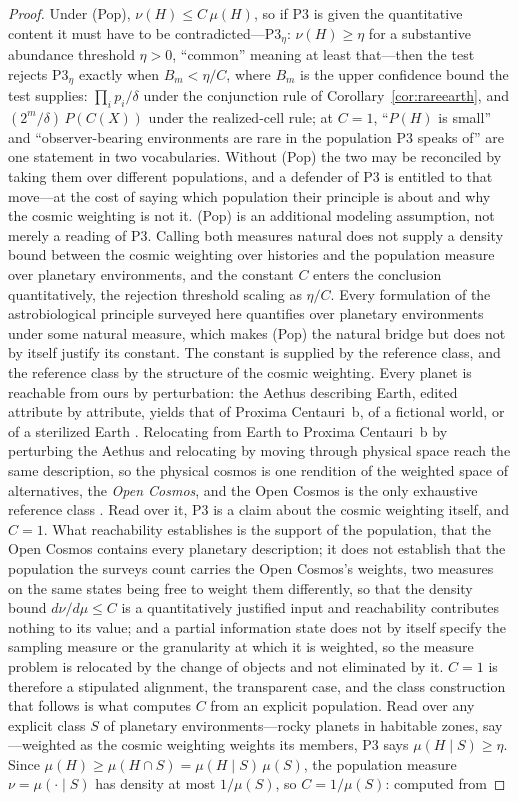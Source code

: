 \begin{proof}
Under (Pop), $\nu(H) \le C\,\mu(H)$, so if P3 is given the quantitative content it must have to be contradicted---$\mathrm{P3}_\eta$: $\nu(H) \ge \eta$ for a substantive abundance threshold $\eta > 0$, ``common'' meaning at least that---then the test rejects $\mathrm{P3}_\eta$ exactly when $B_m < \eta/C$, where $B_m$ is the upper confidence bound the test supplies: $\prod_i p_i/\delta$ under the conjunction rule of Corollary~\ref{cor:rareearth}, and $(2^m/\delta)\,P(C(X))$ under the realized-cell rule; at $C = 1$, ``$P(H)$ is small'' and ``observer-bearing environments are rare in the population P3 speaks of'' are one statement in two vocabularies. Without (Pop) the two may be reconciled by taking them over different populations, and a defender of P3 is entitled to that move---at the cost of saying which population their principle is about and why the cosmic weighting is not it. (Pop) is an additional modeling assumption, not merely a reading of P3. Calling both measures natural does not supply a density bound between the cosmic weighting over histories and the population measure over planetary environments, and the constant $C$ enters the conclusion quantitatively, the rejection threshold scaling as $\eta/C$. Every formulation of the astrobiological principle surveyed here quantifies over planetary environments under some natural measure, which makes (Pop) the natural bridge but does not by itself justify its constant. The constant is supplied by the reference class, and the reference class by the structure of the cosmic weighting. Every planet is reachable from ours by perturbation: the Aethus describing Earth, edited attribute by attribute, yields that of Proxima Centauri~b, of a fictional world, or of a sterilized Earth \cite{Nexus}. Relocating from Earth to Proxima Centauri~b by perturbing the Aethus and relocating by moving through physical space reach the same description, so the physical cosmos is one rendition of the weighted space of alternatives, the \emph{Open Cosmos}, and the Open Cosmos is the only exhaustive reference class \cite{Nexus, Aethus}. Read over it, P3 is a claim about the cosmic weighting itself, and $C = 1$. What reachability establishes is the support of the population, that the Open Cosmos contains every planetary description; it does not establish that the population the surveys count carries the Open Cosmos's weights, two measures on the same states being free to weight them differently, so that the density bound $d\nu/d\mu \le C$ is a quantitatively justified input and reachability contributes nothing to its value; and a partial information state does not by itself specify the sampling measure or the granularity at which it is weighted, so the measure problem is relocated by the change of objects and not eliminated by it. $C = 1$ is therefore a stipulated alignment, the transparent case, and the class construction that follows is what computes $C$ from an explicit population. Read over any explicit class $S$ of planetary environments---rocky planets in habitable zones, say---weighted as the cosmic weighting weights its members, P3 says $\mu(H \mid S) \ge \eta$. Since $\mu(H) \ge \mu(H \cap S) = \mu(H \mid S)\,\mu(S)$, the population measure $\nu = \mu(\cdot \mid S)$ has density at most $1/\mu(S)$, so $C = 1/\mu(S)$: computed from 
\end{proof}

